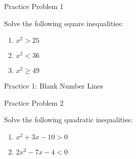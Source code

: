 \documentclass[aspectratio=169]{beamer}
\begin{document}
\begin{frame}{Practice Problem 1}
    \begin{tcolorbox}[colback=lightgray,colframe=accent,title=Practice 1]
        \footnotesize
        Solve the following square inequalities:
        \begin{enumerate}
            \item $x^2 > 25$
            \item $x^2 < 36$
            \item $x^2 \geq 49$
        \end{enumerate}
    \end{tcolorbox}
\end{frame}

\begin{frame}{Practice 1: Blank Number Lines}
    \begin{center}
    \end{center}
\end{frame}

\begin{frame}{Practice Problem 2}
    \begin{tcolorbox}[colback=lightgray,colframe=accent,title=Practice 2]
        \footnotesize
        Solve the following quadratic inequalities:
        \begin{enumerate}
            \item $x^2 + 3x - 10 > 0$
            \item $2x^2 - 7x - 4 < 0$
        \end{enumerate}
    \end{tcolorbox}
\end{frame}
\end{document}
